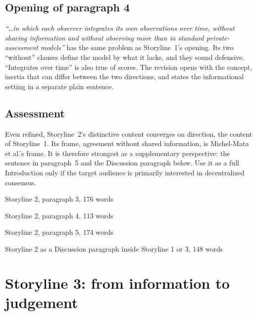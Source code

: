 \documentclass[11pt]{article}
\newcommand{\old}[1]{\textit{``#1''}}
\begin{document}
\subsection*{Opening of paragraph 4}
\old{\dots in which each observer integrates its own observations over time, without sharing information and without observing more than in standard private-assessment models} has the same problem as Storyline~1's opening. Its two ``without'' clauses define the model by what it lacks, and they sound defensive. ``Integrates over time'' is also true of scores. The revision opens with the concept, inertia that can differ between the two directions, and states the informational setting in a separate plain sentence.

\subsection*{Assessment}
Even refined, Storyline~2's distinctive content converges on direction, the content of Storyline~1. Its frame, agreement without shared information, is Michel-Mata et al.'s frame. It is therefore strongest as a supplementary perspective: the sentence in paragraph~5 and the Discussion paragraph below. Use it as a full Introduction only if the target audience is primarily interested in decentralized consensus.

\begin{draft}{Storyline 2, paragraph 3, 176 words}

\end{draft}
\begin{draft}{Storyline 2, paragraph 4, 113 words}

\end{draft}
\begin{draft}{Storyline 2, paragraph 5, 174 words}

\end{draft}
\begin{draft}{Storyline 2 as a Discussion paragraph inside Storyline 1 or 3, 148 words}

\end{draft}

\section{Storyline 3: from information to judgement}
\end{document}
